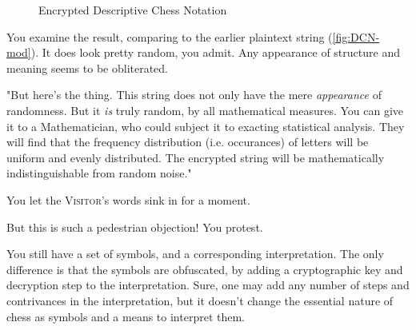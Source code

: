 \begin{figure}[H]
  \begin{center}
  \end{center}
  \caption{Encrypted Descriptive Chess Notation}
  \label{fig:DCN-crypt}
\end{figure}

You examine the result, comparing to the earlier plaintext string (\autoref{fig:DCN-mod}). It does look pretty random, you admit. Any appearance of structure and meaning seems to be obliterated.

"But here's the thing. This string does not only have the mere \emph{appearance} of randomness. But it \emph{is} truly random, by all mathematical measures. You can give it to a Mathematician, who could subject it to exacting statistical analysis. They will find that the frequency distribution (i.e. occurances) of letters will be uniform and evenly distributed. The encrypted string will be mathematically indistinguishable from random noise."

You let the \textsc{Visitor}'s words sink in for a moment.

But this is such a pedestrian objection! You protest.

You still have a set of symbols, and a corresponding interpretation. The only difference is that the symbols are obfuscated, by adding a cryptographic key and decryption step to the interpretation. Sure, one may add any number of steps and contrivances in the interpretation, but it doesn't change the essential nature of chess as symbols and a means to interpret them.


